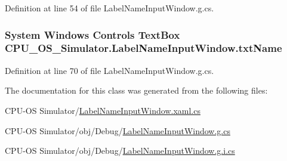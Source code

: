 Definition at line 54 of file Label\+Name\+Input\+Window.\+g.\+cs.

\hypertarget{class_c_p_u___o_s___simulator_1_1_label_name_input_window_aabb275d4d1c6914f2f56f8707befeee4}{}
\subsubsection[{txt\+Name}]{\setlength{\rightskip}{0pt plus 5cm}System Windows Controls Text\+Box C\+P\+U\+\_\+\+O\+S\+\_\+\+Simulator.\+Label\+Name\+Input\+Window.\+txt\+Name\hspace{0.3cm}{\ttfamily [package]}}\label{class_c_p_u___o_s___simulator_1_1_label_name_input_window_aabb275d4d1c6914f2f56f8707befeee4}


Definition at line 70 of file Label\+Name\+Input\+Window.\+g.\+cs.



The documentation for this class was generated from the following files\+:\begin{DoxyCompactItemize}
\item 
C\+P\+U-\/\+O\+S Simulator/\hyperlink{_label_name_input_window_8xaml_8cs}{Label\+Name\+Input\+Window.\+xaml.\+cs}\item 
C\+P\+U-\/\+O\+S Simulator/obj/\+Debug/\hyperlink{_label_name_input_window_8g_8cs}{Label\+Name\+Input\+Window.\+g.\+cs}\item 
C\+P\+U-\/\+O\+S Simulator/obj/\+Debug/\hyperlink{_label_name_input_window_8g_8i_8cs}{Label\+Name\+Input\+Window.\+g.\+i.\+cs}\end{DoxyCompactItemize}
